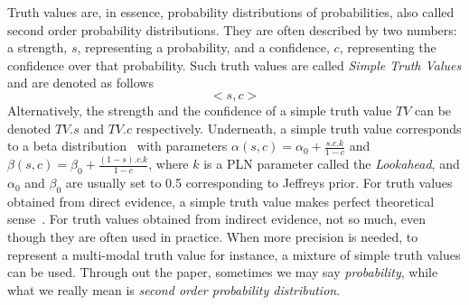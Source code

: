 \documentclass[runningheads]{llncs}
\newcommand{\TEval}{\textit{Evaluation}}
\newcommand{\TLamb}{\textit{Lambda}}
\newcommand{\TAnd}{\textit{And}}
\newcommand{\TOr}{\textit{Or}}
\newcommand{\TNot}{\textit{Not}}
\newcommand{\TImpl}{\textit{Implication}}
\newcommand{\TTV}{\textit{TV}}
\begin{document}
Truth values are, in essence, probability distributions of
probabilities, also called second order probability distributions.
They are often described by two numbers: a strength, $s$, representing
a probability, and a confidence, $c$, representing the confidence over
that probability.  Such truth values are called \emph{Simple Truth
  Values} and are denoted as follows
$$<\!s, c\!>$$
Alternatively, the strength and the confidence of a simple truth value
$\TTV$ can be denoted $\TTV.s$ and $\TTV.c$ respectively.  Underneath,
a simple truth value corresponds to a beta
distribution~\cite{Abourizk94Fitting} with parameters
$\alpha(s, c)=\alpha_0 + \frac{s.c.k}{1-c}$ and
$\beta(s, c)=\beta_0 + \frac{(1-s).c.k}{1-c}$, where $k$ is a PLN
parameter called the \emph{Lookahead}, and $\alpha_0$ and $\beta_0$
are usually set to 0.5 corresponding to Jeffreys prior.  For truth
values obtained from direct evidence, a simple truth value makes
perfect theoretical sense~\cite{TODO}.  For truth values obtained from
indirect evidence, not so much, even though they are often used in
practice.  When more precision is needed, to represent a multi-modal
truth value for instance, a mixture of simple truth values can be
used.  Through out the paper, sometimes we may say \emph{probability},
while what we really mean is \emph{second order probability
  distribution}.


\end{document}

